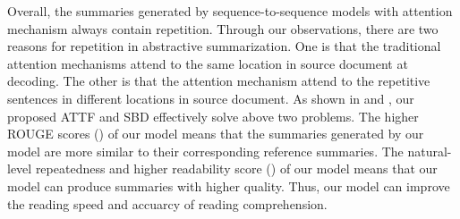 Overall, the summaries generated by sequence-to-sequence models with attention mechanism always contain repetition.  
Through our observations, there are two reasons for repetition in abstractive summarization.
One is that the traditional attention mechanisms attend to the same location in source document at decoding.
The other is that the attention mechanism attend to the repetitive sentences in different locations in source document. 
As shown in  and ,
our proposed ATTF and SBD effectively solve above two problems.  
The higher ROUGE scores () of our model means that
the summaries generated by our model are more similar to their corresponding reference summaries.
The natural-level repeatedness and higher readability score () of our model means 
that our model can produce summaries with higher quality.
Thus, our model can improve the reading speed and accuarcy of reading comprehension.


